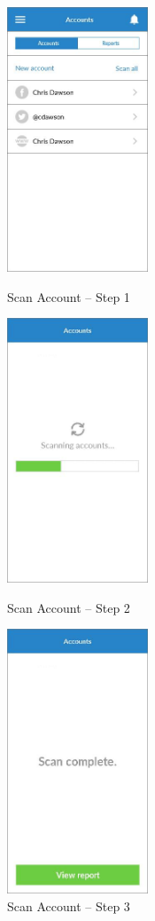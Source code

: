 \begin{figure}
  \subfigures
  \centering
  \begin{minipage}{4.6cm}
    \centering
    \includegraphics[width=4.2cm]{inc/ui_scan_step1.jpg}
    \caption{Scan Account -- Step 1}
    \label{fig:ui_scan_step1}
  \end{minipage}
  \begin{minipage}{4.6cm}
    \centering
    \includegraphics[width=4.2cm]{inc/ui_scan_step2.jpg}
    \caption{Scan Account -- Step 2}
    \label{fig:ui_scan_step2}
  \end{minipage}
  \begin{minipage}{4.6cm}
    \centering
    \includegraphics[width=4.2cm]{inc/ui_scan_step3.jpg}
    \caption{Scan Account -- Step 3}
    \label{fig:ui_scan_step3}
  \end{minipage}
\end{figure}

